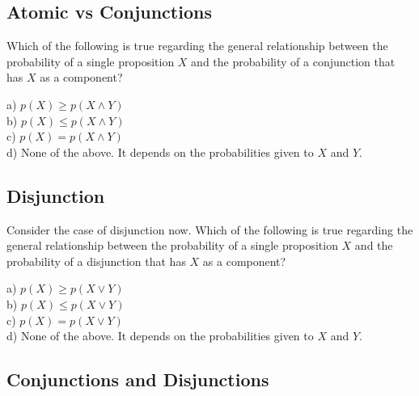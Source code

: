 \documentclass[]{tufte-book}
\begin{document}
\hypertarget{atomic-vs-conjunctions}{%
\subsection{Atomic vs Conjunctions}\label{atomic-vs-conjunctions}}

Which of the following is true regarding the general relationship between the probability of a single proposition \(X\) and the probability of a conjunction that has \(X\) as a component?

a) \(p(X)\geq p(X\wedge Y)\)\\
b) \(p(X)\leq p(X\wedge Y)\)\\
\hspace*{0.333em}\hspace*{0.333em}\hspace*{0.333em}c) \(p(X) = p(X\wedge Y)\)\\
\hspace*{0.333em}\hspace*{0.333em}\hspace*{0.333em}d) None of the above. It depends on the probabilities given to \(X\) and \(Y\).

\hypertarget{disjunction}{%
\subsection{Disjunction}\label{disjunction}}

Consider the case of disjunction now. Which of the following is true regarding the general relationship between the probability of a single proposition \(X\) and the probability of a disjunction that has \(X\) as a component?

a) \(p(X)\geq p(X\vee Y)\)\\
\hspace*{0.333em}\hspace*{0.333em}b) \(p(X)\leq p(X\vee Y)\)\\
\hspace*{0.333em}\hspace*{0.333em}c) \(p(X) = p(X\vee Y)\)\\
\hspace*{0.333em}\hspace*{0.333em}d) None of the above. It depends on the probabilities given to \(X\) and \(Y\).

\hypertarget{conjunctions-and-disjunctions}{%
\subsection{Conjunctions and Disjunctions}\label{conjunctions-and-disjunctions}}
\end{document}
